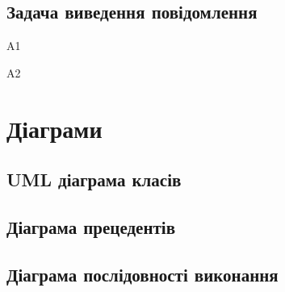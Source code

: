 \documentclass[oneside,14pt]{extarticle}
\begin{document}
\subsection{Задача виведення повідомлення}
\begin{list}{}{Алгоритм A.}
	\item [A1] 
	\item [A2] 
\end{list}

\section{Діаграми}
\subsection{UML діаграма класів}
\subsection{Діаграма прецедентів}
\subsection{Діаграма послідовності виконання}
\end{document}
